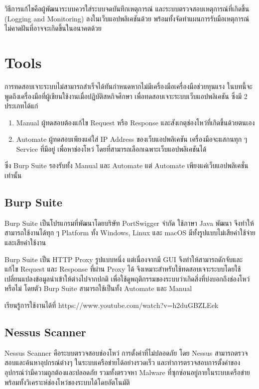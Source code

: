 วิธีการแก้ไขคือผู้พัฒนาระบบควรใส่ระบบจดบันทึกเหตุการณ์ และระบบตรวจสอบเหตุการณ์ที่เกิดขึ้น (Logging and Monitoring) ลงในเว็บแอปพลิเคชันด้วย พร้อมทั้งจัดทำแผนการรับมือเหตุการณ์ไม่คาดฝันที่อาจจะเกิดขึ้นในอนาคตด้วย

\section{Tools}

การทดสอบเจาะระบบไม่สามารถสำเร็จได้ทันกำหนดหากไม่มีเครื่องมือเครื่องมือช่วยทุนแรง ในบทนี้จะพูดถึงเครื่องมือที่ผู้เขียนใช้งานเมื่อปฏิบัติสหกิจศึกษา เพื่อทดสอบเจาะระบบเว็บแอปพลิเคชัน ซึ่งมี 2 ประเภทได้แก่

\begin{enumerate}
	\item Manual ผู้ทดสอบต้องแก้ไข Request หรือ Response และสังเกตุช่องโหว่ที่เกิดขึ้นด้วยตนเอง 
	\item Automate ผู้ทดสอบเพียงแค่ใส่ IP Address ของเว็บแอปพลิเคชัน เครื่องมือจะแสกนทุก ๆ Service ที่มีอยู่ เพื่อหาช่องโหว่ โดยที่สามารถเลือกเฉพาะเว็บแอปพลิเคชันได้
\end{enumerate}

ซึ่ง Burp Suite รองรับทั้ง Manual และ Automate แต่ Automate เพียงแค่เว็บแอปพลิเคชั่นเท่านั้น

\subsection{Burp Suite}

Burp Suite เป็นโปรแกรมที่พัฒนาโดยบริษัท PortSwigger จำกัด ใช้ภาษา Java พัฒนา จึงทำให้สามารถใช้งานได้ทุก ๆ Platform ทั้ง Windows, Linux และ macOS มีทั้งรูปแบบไม่เสียค่าใช้จ่ายและเสียค่าใช้งาน

Burp Suite เป็น HTTP Proxy รูปแบบหนึ่ง แต่เนื่องจากมี GUI จึงทำให้สามารถดักจับและแก้ไข Request และ Response ที่ผ่าน Proxy ได้ จึงเหมาะสำหรับใช้ทดสอบเจาะระบบโดยใช้เปลี่ยนแปลงข้อมูลนำเข้าให้ต่างไปจากปกติ เพื่อใช้ดูพฤติกรรมของระบบว่าเกิดสิ่งที่บ่งบอกถึงช่องโหว่หรือไม่ โดยตัว Burp Suite สามารถใช้เป็นทั้ง Automate และ Manual

เรียนรู้การใช้งานได้ที่ https://www.youtube.com/watch?v=h2duGBZLEek

\subsection{Nessus Scanner}
Nessus Scanner คือระบบตรวจสอบช่องโหว่ การตั้งค่าที่ไม่ปลอดภัย โดย Nessus สามารถตรวจสอบและค้นหาอุปกรณ์ต่างๆ ในระบบเครือข่ายได้อย่างรวดเร็ว และทำการตรวจสอบการตั้งค่าของอุปกรณ์ว่ามีความถูกต้องและปลอดภัย รวมทั้งตรวจหา Malware ที่ซุกซ่อนอยู่ภายในระบบเครือข่ายพร้อมทั้งวิเคราะห์ช่องโหว่ของระบบได้โดยอัตโนมัติ \cite{??}

